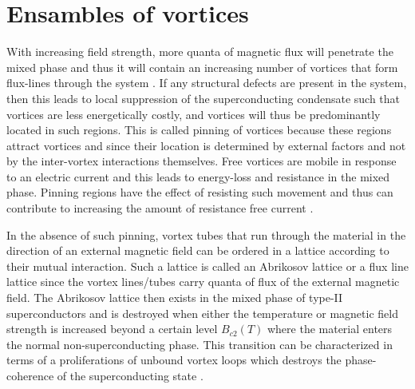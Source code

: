 \section{Ensambles of vortices}

With increasing field strength, more quanta of magnetic flux will penetrate the mixed phase and thus it will contain an increasing number of vortices that form flux-lines through the system
. If any structural defects are present in the
system, then this leads to local suppression of the superconducting condensate such that vortices are less energetically costly, and vortices will thus be predominantly located in such regions.
This is called pinning of vortices because these regions attract vortices and since their location is determined by external factors and not by the inter-vortex interactions themselves.
Free vortices are mobile in 
response to an electric current and this leads to energy-loss and resistance in the mixed phase. Pinning regions have the effect of resisting such movement and thus can contribute to increasing
the amount of resistance free current \cite{Ishida19}.

In the absence of such pinning, vortex tubes that run through the material in the direction of an external magnetic field can be ordered in a lattice according to their mutual interaction.
Such a lattice is called an Abrikosov lattice or a flux line lattice since the vortex lines/tubes carry quanta of flux of the external magnetic field.
The Abrikosov lattice then exists in the mixed phase of type-II superconductors and is destroyed when either the temperature or magnetic field strength is increased beyond a certain level
$B_{c2}(T)$ where the material enters the normal non-superconducting phase. This transition can be characterized in terms of a proliferations of unbound vortex loops which destroys the
phase-coherence of the superconducting state \cite{Fossheim-Sudbo-Book}.

